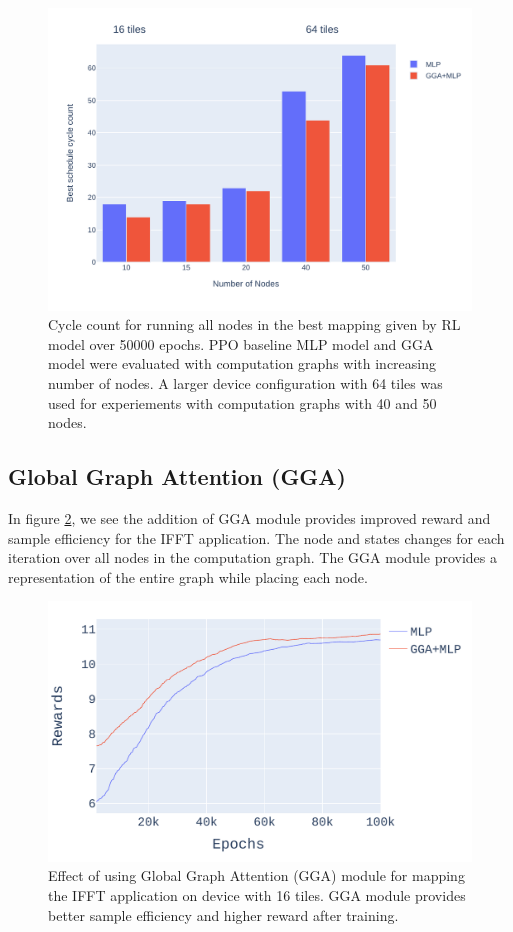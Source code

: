 \begin{figure}[h]
  \centering
  \includegraphics[width=\linewidth]{fig/nodes_graph.pdf}
  \caption{Cycle count for running all nodes in the best mapping given by RL model over 50000 epochs. 
  PPO baseline MLP model and GGA model were evaluated with computation graphs with increasing number of nodes. 
  A larger device configuration with 64 tiles was used for experiements with computation graphs with 40 and 50 nodes. }
  \label{fig:nodes_graph}
\end{figure}


\subsection{Global Graph Attention (GGA)}

In figure \ref{fig:ifft_rewards}, we see the addition of GGA module provides improved reward and sample efficiency for the IFFT application. 
The node and states changes for each iteration over all nodes in the computation graph. The GGA module provides 
a representation of the entire graph while placing each node.

\begin{figure}[h]
  \centering
  \includegraphics[width=\linewidth]{fig/plot_gnn_atten_ppo.pdf}
  \caption{Effect of using Global Graph Attention (GGA) module for mapping the IFFT application on device with 16 tiles. 
  GGA module provides better sample efficiency and higher reward after training. }
  \label{fig:ifft_rewards}
\end{figure}


